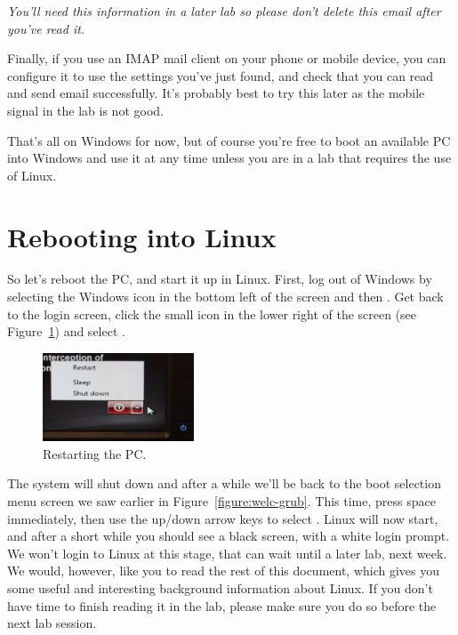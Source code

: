 \enlargethispage{\baselineskip}
\emph{You'll need this information in a later lab so please don't delete this email after you've read it.}


Finally, if you use an IMAP mail client on your phone or mobile
device, you can configure it to use the settings you've just found, and check
that you can read and send email successfully. It's probably best to try this later as the mobile signal in the lab is not good.

That's all on Windows for now, but of course  you're free to boot an available PC into Windows  and use it at any time unless you are in a lab that requires the use of Linux. 

\section{Rebooting into Linux}
\label{sec:rebooting-into-linux}

So let's reboot the PC, and start it up in Linux. First, log out of
Windows by selecting the Windows icon in the bottom left of the screen and then . Get back to the login screen, click the
small icon in the lower right of the screen (see Figure~\ref{figure:welc-restart}) and select .

\begin{figure}
\centerline{\includegraphics[width=0.4\textwidth]{images/TH-shutdown-win}}
\caption{Restarting the PC.}
\label{figure:welc-restart}
\end{figure}

The system will shut down and after a while we'll be back to the boot selection menu
screen we saw earlier in Figure~\ref{figure:welc-grub}. This time, press space immediately, then use
the up/down arrow keys to select . Linux will now start, and after a short while you should
see a black screen, with a white login prompt. We won't login to Linux
at this stage, that can wait until a later lab, next week. We would,
however, like you to read the rest of this document, which gives you
some useful and interesting background information about Linux. If you
don't have time to finish reading it in the lab, please make sure you
do so before the next lab session.

